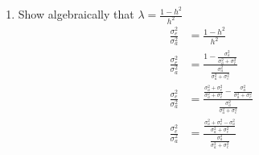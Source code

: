 \documentclass[12pt,a4paper]{paper}
\begin{document}
\begin{enumerate}[resume]
\begin{equation*}
\begin{tabular}{rrrrrrrrrrr}
  1.00 & 1.00 & 0.00 & 1.00 & 0.00 & -1.50 & -1.50 & 0.00 & 4.00 & 0.00 & 0.00 \\ 
  1.00 & 0.00 & 1.00 & 1.00 & 0.00 & 0.00 & -1.50 & -1.50 & 0.00 & 4.00 & 0.00 \\ 
  2.00 & 0.00 & 2.00 & 1.00 & 1.00 & 0.00 & 0.00 & -1.00 & 0.00 & 0.00 & 4.00 \\ 
\end{tabular}\right]\left[\begin{array}{c}\mu\\H_{1}\\H_{2}\\L_{1}\\L_{2}\\C_{1}\\S_{1}\\C_{3}\\C_{2}\\C_{4}\\C_{5}\end{array}\right] = \left[\begin{array}{c}5565 \\ 
  1780 \\ 
  3785 \\ 
  3275 \\ 
  2290 \\ 
  1280 \\ 
  0 \\ 
  1695 \\ 
  500 \\ 
  775 \\ 
  1315 \\ \end{array}\right]
\end{equation*}
\item Show algebraically that $\lambda = \frac{1-h^{2}}{h^{2}}$
\begin{equation*}
\begin{split}
\frac{\sigma^{2}_{e}}{\sigma^{2}_{a}} &= \frac{1-h^{2}}{h^{2}}\\
\frac{\sigma^{2}_{e}}{\sigma^{2}_{a}} &= \frac{1-\frac{\sigma^{2}_{a}}{\sigma^{2}_{a} +\sigma^{2}_{e}}}{\frac{\sigma^{2}_{a}}{\sigma^{2}_{a}+\sigma^{2}_{e}}}\\
\frac{\sigma^{2}_{e}}{\sigma^{2}_{a}} &= \frac{\frac{\sigma^{2}_{a}+\sigma^{2}_{e}}{\sigma^{2}_{a}+\sigma^{2}_{e}}-\frac{\sigma^{2}_{a}}{\sigma^{2}_{a} +\sigma^{2}_{e}}}{\frac{\sigma^{2}_{a}}{\sigma^{2}_{a}+\sigma^{2}_{e}}}\\
\frac{\sigma^{2}_{e}}{\sigma^{2}_{a}} &= \frac{\frac{\sigma^{2}_{a}+\sigma^{2}_{e}-\sigma^{2}_{a}}{\sigma^{2}_{a}+\sigma^{2}_{e}}}{\frac{\sigma^{2}_{a}}{\sigma^{2}_{a}+\sigma^{2}_{e}}}\\

\end{split}
\end{equation*}
\end{enumerate}
\end{document}
